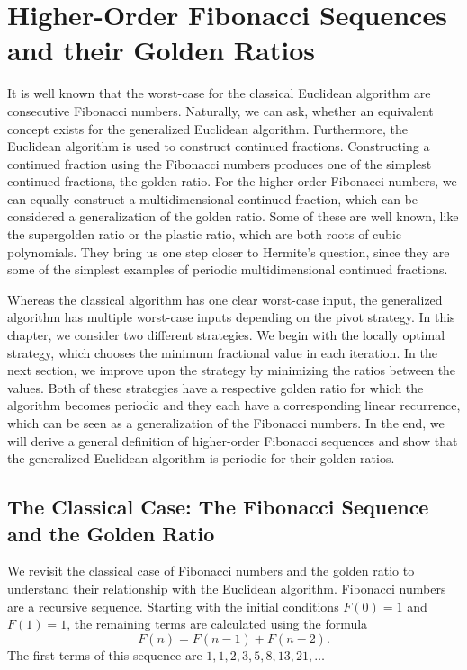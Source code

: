 \chapter{Higher-Order Fibonacci Sequences and their Golden Ratios}
\label{ch:fibonacci}

It is well known that the worst-case for the classical Euclidean algorithm
are consecutive Fibonacci numbers.
Naturally, we can ask, whether an equivalent concept exists for the generalized
Euclidean algorithm.
Furthermore, the Euclidean algorithm is used to construct continued fractions.
Constructing a continued fraction using the Fibonacci numbers
produces one of the simplest continued fractions, the golden ratio.
For the higher-order Fibonacci numbers,
we can equally construct a multidimensional continued fraction,
which can be considered a generalization of the golden ratio.
Some of these are well known, like the supergolden ratio or the plastic ratio,
which are both roots of cubic polynomials.
They bring us one step closer to Hermite's question,
since they are some of the simplest examples of periodic multidimensional
continued fractions.

Whereas the classical algorithm has one clear worst-case input,
the generalized algorithm has multiple worst-case inputs
depending on the pivot strategy.
In this chapter, we consider two different strategies.
We begin with the locally optimal strategy,
which chooses the minimum fractional value in each iteration.
In the next section, we improve upon the strategy by minimizing the ratios between the values.
Both of these strategies have a respective golden ratio for which the algorithm
becomes periodic and they each have a corresponding linear recurrence, which
can be seen as a generalization of the Fibonacci numbers.
In the end, we will derive a general definition of higher-order Fibonacci
sequences and show that the generalized Euclidean algorithm is periodic for
their golden ratios.

\section{The Classical Case: The Fibonacci Sequence and the Golden Ratio}

We revisit the classical case of Fibonacci numbers and the golden ratio
to understand their relationship with the Euclidean algorithm.
Fibonacci numbers are a recursive sequence.
Starting with the initial conditions $F(0) = 1$ and $F(1) = 1$,
the remaining terms are calculated using the formula
\[
  F(n) = F(n-1) + F(n-2).
\]
The first terms of this sequence are $1, 1, 2, 3, 5, 8, 13, 21, …$

